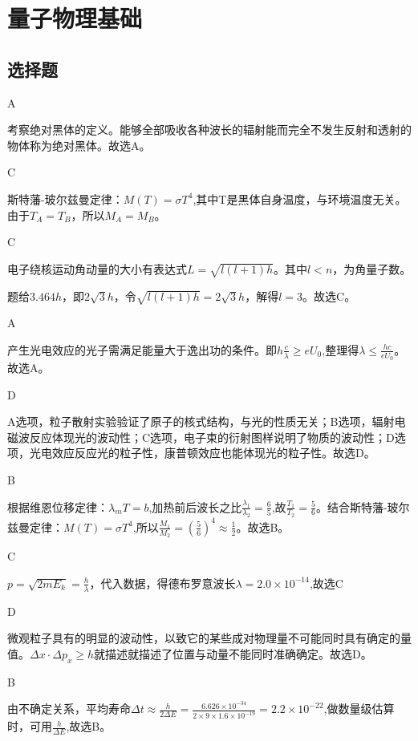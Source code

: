 \chapter{量子物理基础}

\section{选择题}
\exercise A

\solve 考察绝对黑体的定义。能够全部吸收各种波长的辐射能而完全不发生反射和透射的物体称为绝对黑体。故选A。

\exercise C

\solve 斯特藩-玻尔兹曼定律：$M(T)=\sigma T^4$,其中T是黑体自身温度，与环境温度无关。由于$T_A=T_B$，所以$M_A=M_B$。

\exercise C

\solve 电子绕核运动角动量的大小有表达式$L=\sqrt{l(l+1)h}$。其中$l<n$，为角量子数。%

题给$3.464h$，即$2\sqrt{3}h$，令$\sqrt{l(l+1)h}=2\sqrt{3}h$，解得$l=3$。故选C。

\exercise A

\solve 产生光电效应的光子需满足能量大于逸出功的条件。即$h\frac{c}{\lambda}\ge eU_0$,整理得$\lambda \le\frac{hc}{eU_0}$。故选A。

\exercise D

\solve A选项，\alpha 粒子散射实验验证了原子的核式结构，与光的性质无关；B选项，辐射电磁波反应体现光的波动性；C选项，电子束的衍射图样说明了物质的波动性；D选项，光电效应反应光的粒子性，康普顿效应也能体现光的粒子性。故选D。

\exercise B

\solve 根据维恩位移定律：$\lambda_mT=b$,加热前后波长之比$\frac{\lambda_1}{\lambda_2}=\frac{6}{5}$,故$\frac{T_1}{T_2}=\frac{5}{6}$。结合斯特藩-玻尔兹曼定律：$M(T)=\sigma T^4$,所以$\frac{M_1}{M_2}=(\frac{5}{6})^4\approx\frac{1}{2}$。故选B。

\exercise C

\solve $p=\sqrt{2mE_k}=\frac{h}{\lambda}$，代入数据，得德布罗意波长$\lambda=2.0\times10^{-14}$,故选C

\exercise D

\solve 微观粒子具有的明显的波动性，以致它的某些成对物理量不可能同时具有确定的量值。$\Delta x\cdot \Delta p_x\ge h$就描述就描述了位置与动量不能同时准确确定。故选D。

\exercise B

\solve 由不确定关系，平均寿命$\Delta t\approx\frac{h}{2\Delta E}=\frac{6.626\times10^{-34}}{2\times9\times1.6\times10^{-19}}=2.2\times10^{-22}$,做数量级估算时，可用$\frac{h}{\Delta E}$,故选B。

